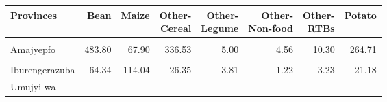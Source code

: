 \begin{table}[!h]
\centering\begingroup\fontsize{7}{9}\selectfont

\begin{tabular}{>{\raggedright\arraybackslash}p{1.8cm}rrrrrrr}
\toprule
Provinces & Bean & Maize & \makecell{Other-\\Cereal} & \makecell{Other-\\Legume} & \makecell{Other-\\Non-food} & \makecell{Other-\\RTBs} & Potato\\
\midrule
\cellcolor{gray!10}{Amajyaruguru} & \cellcolor{gray!10}{432.84} & \cellcolor{gray!10}{121.89} & \cellcolor{gray!10}{65.42} & \cellcolor{gray!10}{5.77} & \cellcolor{gray!10}{1.92} & \cellcolor{gray!10}{5.64} & \cellcolor{gray!10}{49.94}\\
Amajyepfo & 483.80 & 67.90 & 336.53 & 5.00 & 4.56 & 10.30 & 264.71\\
\cellcolor{gray!10}{Iburasirazuba} & \cellcolor{gray!10}{112.37} & \cellcolor{gray!10}{27.81} & \cellcolor{gray!10}{18.61} & \cellcolor{gray!10}{78.06} & \cellcolor{gray!10}{1.56} & \cellcolor{gray!10}{82.91} & \cellcolor{gray!10}{10.07}\\
Iburengerazuba & 64.34 & 114.04 & 26.35 & 3.81 & 1.22 & 3.23 & 21.18\\
Umujyi wa
\cellcolor{gray!10}{Kigali} & \cellcolor{gray!10}{127.61} & \cellcolor{gray!10}{10.90} & \cellcolor{gray!10}{7.65} & \cellcolor{gray!10}{1.31} & \cellcolor{gray!10}{0.03} & \cellcolor{gray!10}{0.42} & \cellcolor{gray!10}{5.97}\\
\bottomrule
\end{tabular}
\endgroup{}
\end{table}
